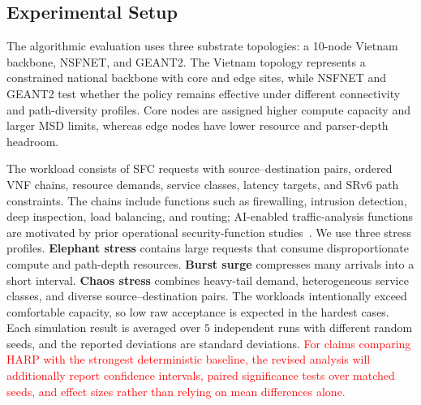 \documentclass[final,5p]{elsarticle}
\newcommand{\rev}[1]{\textcolor{red}{#1}}
\begin{document}
\subsection{Experimental Setup}
\label{subsec:experimental_setup}

The algorithmic evaluation uses three substrate topologies: a 10-node Vietnam backbone, NSFNET, and GEANT2. The Vietnam topology represents a constrained national backbone with core and edge sites, while NSFNET and GEANT2 test whether the policy remains effective under different connectivity and path-diversity profiles. Core nodes are assigned higher compute capacity and larger MSD limits, whereas edge nodes have lower resource and parser-depth headroom.

The workload consists of SFC requests with source--destination pairs, ordered VNF chains, resource demands, service classes, latency targets, and SRv6 path constraints. The chains include functions such as firewalling, intrusion detection, deep inspection, load balancing, and routing; AI-enabled traffic-analysis functions are motivated by prior operational security-function studies~\cite{jSAID23,jAPELID24,cCSFS25}. We use three stress profiles. \textbf{Elephant stress} contains large requests that consume disproportionate compute and path-depth resources. \textbf{Burst surge} compresses many arrivals into a short interval. \textbf{Chaos stress} combines heavy-tail demand, heterogeneous service classes, and diverse source--destination pairs. The workloads intentionally exceed comfortable capacity, so low raw acceptance is expected in the hardest cases.
Each simulation result is averaged over \(5\) independent runs with different random seeds, and the reported deviations are standard deviations. \rev{For claims comparing HARP with the strongest deterministic baseline, the revised analysis will additionally report confidence intervals, paired significance tests over matched seeds, and effect sizes rather than relying on mean differences alone.}
\end{document}
